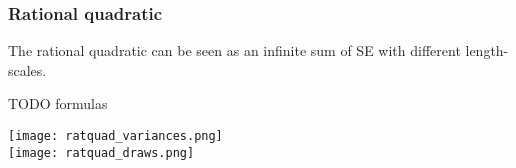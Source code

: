 \subsubsection{Rational quadratic}
The rational quadratic can be seen as an infinite sum of SE with different length-scales.

TODO formulas

\texttt{[image: ratquad\_variances.png]} \\
\texttt{[image: ratquad\_draws.png]} \\


% 
% 
% 


% 
% 
% 
% 
% 
% 
% 
% 


